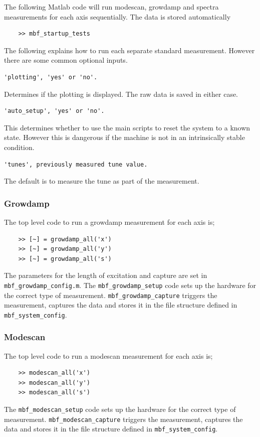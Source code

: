\documentclass{report}
\begin{document}
The following Matlab code will run modescan, growdamp and spectra measurements for each axis sequentially. The data is stored automatically 
\begin{verbatim}
    >> mbf_startup_tests 
\end{verbatim}
\vspace{2mm}
The following explains how to run each separate standard measurement. However there are some common optional inputs.
\begin{verbatim}
'plotting', 'yes' or 'no'. 
\end{verbatim}
Determines if the plotting is displayed. The raw data is saved in either case.
\begin{verbatim}
'auto_setup', 'yes' or 'no'. 
\end{verbatim}
This determines whether to use the main scripts to reset the system to a known state. However this is dangerous if the machine is not in an intrinsically stable condition.
\begin{verbatim}
'tunes', previously measured tune value.
\end{verbatim}
The default is to measure the tune as part of the measurement.
\subsubsection{Growdamp}
The top level code to run a growdamp measurement for each axis is; 
\begin{verbatim}
    >> [~] = growdamp_all('x') 
    >> [~] = growdamp_all('y') 
    >> [~] = growdamp_all('s') 
\end{verbatim}

The parameters for the length of excitation and  capture are set in \verb|mbf_growdamp_config.m|.
 The \verb|mbf_growdamp_setup| code sets up the hardware for the correct type of measurement. \verb|mbf_growdamp_capture| triggers the measurement, captures the data and stores it in the file structure defined in \verb|mbf_system_config|. 
\subsubsection{Modescan}
The top level code to run a modescan measurement for each axis is; 
\begin{verbatim}
    >> modescan_all('x') 
    >> modescan_all('y') 
    >> modescan_all('s') 
\end{verbatim}

The \verb|mbf_modescan_setup| code sets up the hardware for the correct type of measurement. \verb|mbf_modescan_capture| triggers the measurement, captures the data and stores it in the file structure defined in \verb|mbf_system_config|. 
\end{document}
